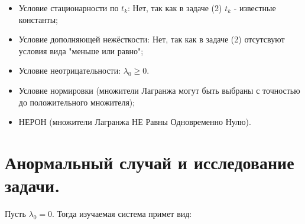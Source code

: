 \documentclass[a4paper,12pt]{article}
\begin{document}
\begin{itemize}
\item[\text{(г)}]
Условие стационарности по $t_k$:\newline
Нет, так как в задаче (2) $t_k$ - известные константы;

\item[\text{(д)}]
Условие дополняющей нежёсткости:\newline
Нет, так как в задаче (2) отсутсвуют условия вида "меньше или равно"; 

\item[\text{(e)}]
Условие неотрицательности: $\lambda_0 \geq 0.$

\item[\text{(ж)}]
Условие нормировки (множители Лагранжа могут быть выбраны с точностью до положительного множителя);

\item[\text{(з)}]
НЕРОН (множители Лагранжа НЕ Равны Одновременно Нулю).
\end{itemize}

\section{Анормальный случай и исследование задачи.}
Пусть $\lambda_0 = 0.$ Тогда изучаемая система примет вид:
\end{document}
